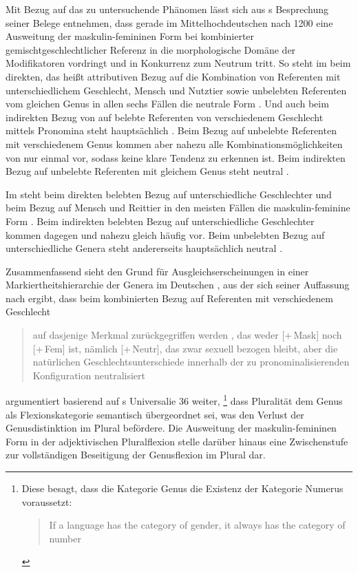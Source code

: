 Mit Bezug auf das zu untersuchende Phänomen lässt sich aus
\citeauthor{askedal1973}s Besprechung seiner Belege entnehmen, dass gerade im
Mittelhochdeutschen nach 1200
eine Ausweitung der maskulin-femininen Form bei kombinierter
gemischt\-geschlechtlicher Referenz in die morphologische Domäne der
Modifikatoren vordringt und in Konkurrenz zum Neutrum tritt. So steht im
 beim direkten, das heißt attributiven Bezug auf die Kombination
von Referenten mit unterschiedlichem Geschlecht, Mensch und Nutztier sowie
unbelebten Referenten vom gleichen Genus in allen sechs Fällen die neutrale
Form . Und auch beim indirekten Bezug von  auf belebte
Referenten von verschiedenem Geschlecht mittels Pronomina steht hauptsächlich
. Beim Bezug auf unbelebte Referenten mit verschiedenem Genus
kommen aber nahezu alle Kombinationsmöglichkeiten von  nur einmal vor, sodass keine klare Tendenz zu erkennen ist. Beim
indirekten Bezug auf unbelebte Referenten mit gleichem Genus steht neutral
 \autocites[145--148,
158--161]{askedal1973}[nach][]{lachmannhartl1952}.

Im  steht beim direkten belebten Bezug auf unterschiedliche
Geschlechter und beim Bezug auf Mensch und Reittier in den meisten Fällen die
maskulin-feminine Form .
Beim indirekten belebten Bezug auf unterschiedliche Geschlechter kommen dagegen
 und  nahezu gleich häufig vor. Beim unbelebten
Bezug auf unterschiedliche Genera steht andererseits hauptsächlich neutral
 \autocites[95--99,
126--128]{askedal1973}[nach][]{maroldschroeder1969}.

Zusammenfassend sieht \citeauthor{askedal1973} den Grund für
Ausgleichserscheinungen in einer Markiertheitshierarchie der Genera im
Deutschen \autocite[241--247]{askedal1973}, aus der sich seiner Auffassung nach
ergibt, dass beim kombinierten Bezug auf Referenten mit verschiedenem
Geschlecht \blockcquote[253]{askedal1973}{auf dasjenige Merkmal zurückgegriffen
werden , das weder [+\,Mask] noch [+\,Fem] ist, nämlich
[+\,Neutr], das zwar sexuell bezogen bleibt, aber die natürlichen
Geschlechts\-unterschiede innerhalb der zu pronominalisierenden Konfiguration
neutralisiert}. \citet[173--177]{askedal1973} argumentiert basierend auf
\citeauthor{greenberg1966}s Universalie 36 weiter,%
%
	\footnote{Diese besagt, dass die Kategorie Genus die Existenz der Kategorie
		Numerus voraussetzt:
		\foreignblockcquote{english}[112]{greenberg1966}{If a language has
		the category of gender, it always has the category of number}.%
	}
%
dass Pluralität dem Genus als Flexionskategorie semantisch übergeordnet sei,
was den Verlust der Genusdistinktion im Plural befördere. Die Ausweitung der
maskulin-femininen Form in der adjektivischen Plural\-flexion stelle darüber
hinaus eine Zwischenstufe zur vollständigen Beseitigung der Genusflexion im
Plural dar.

